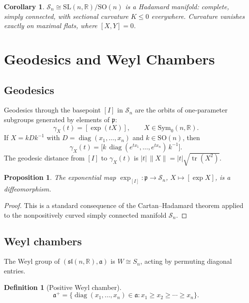 \documentclass[12pt]{article}
\newtheorem{proposition}[theorem]{Proposition}
\newtheorem{corollary}[theorem]{Corollary}
\theoremstyle{definition}
\newtheorem{definition}[theorem]{Definition}
\theoremstyle{remark}
\newcommand{\R}{\mathbb{R}}
\newcommand{\SL}{\mathrm{SL}}
\newcommand{\SO}{\mathrm{SO}}
\newcommand{\Symz}{\mathrm{Sym}_{0}}
\newcommand{\calM}{\mathcal{S}}
\newcommand{\tr}{\operatorname{tr}}
\newcommand{\diag}{\operatorname{diag}}
\begin{document}
\begin{corollary}
$\calM_n \cong \SL(n,\R)/\SO(n)$ is a Hadamard manifold: complete,
simply connected, with sectional curvature $K \leq 0$ everywhere.
Curvature vanishes exactly on maximal flats, where $[X,Y]=0$.
\end{corollary}

\section{Geodesics and Weyl Chambers}
\label{sec:weyl}

\subsection{Geodesics}

Geodesics through the basepoint $[I]$ in $\calM_n$ are the orbits
of one-parameter subgroups generated by elements of $\mathfrak{p}$:
\[
  \gamma_X(t) = [\exp(tX)], \qquad X \in \Symz(n,\R).
\]
If $X = k D k^{-1}$ with $D = \diag(x_1,\ldots,x_n)$ and
$k \in \SO(n)$, then
\[
  \gamma_X(t) = \bigl[k\,\diag(e^{tx_1},\ldots,e^{tx_n})\,k^{-1}\bigr].
\]
The geodesic distance from $[I]$ to $\gamma_X(t)$ is
$|t|\,\|X\| = |t|\sqrt{\tr(X^2)}$.

\begin{proposition}
The exponential map $\exp_{[I]} : \mathfrak{p} \to \calM_n$,
$X \mapsto [\exp X]$, is a diffeomorphism.
\end{proposition}

\begin{proof}
This is a standard consequence of the Cartan--Hadamard theorem applied
to the nonpositively curved simply connected manifold $\calM_n$.
\end{proof}

\subsection{Weyl chambers}

The Weyl group of $(\mathfrak{sl}(n,\R), \mathfrak{a})$ is
$W \cong S_n$, acting by permuting diagonal entries.

\begin{definition}[Positive Weyl chamber]
\[
  \mathfrak{a}^+ = \{\diag(x_1,\ldots,x_n) \in \mathfrak{a} :
    x_1 \geq x_2 \geq \cdots \geq x_n\}.
\]
\end{definition}
\end{document}
